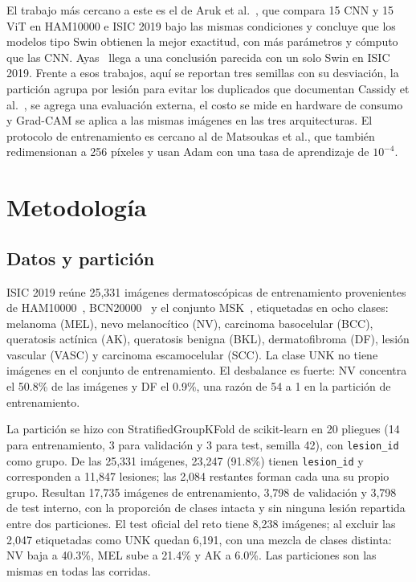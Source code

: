 \documentclass[conference]{IEEEtran}
\begin{document}
El trabajo más cercano a este es el de Aruk et al.~\cite{aruk2026comparison}, que compara 15 CNN y 15 ViT en HAM10000 e ISIC 2019 bajo las mismas condiciones y concluye que los modelos tipo Swin obtienen la mejor exactitud, con más parámetros y cómputo que las CNN. Ayas~\cite{ayas2023swin} llega a una conclusión parecida con un solo Swin en ISIC 2019. Frente a esos trabajos, aquí se reportan tres semillas con su desviación, la partición agrupa por lesión para evitar los duplicados que documentan Cassidy et al.~\cite{cassidy2022isic}, se agrega una evaluación externa, el costo se mide en hardware de consumo y Grad-CAM se aplica a las mismas imágenes en las tres arquitecturas. El protocolo de entrenamiento es cercano al de Matsoukas et al., que también redimensionan a 256 píxeles y usan Adam con una tasa de aprendizaje de $10^{-4}$.

\section{Metodología}

\subsection{Datos y partición}

ISIC 2019 reúne 25,331 imágenes dermatoscópicas de entrenamiento provenientes de HAM10000~\cite{tschandl2018ham10000}, BCN20000~\cite{hernandezperez2024bcn20000,combalia2019bcn20000} y el conjunto MSK~\cite{codella2017isic,codella2019isic2018}, etiquetadas en ocho clases: melanoma (MEL), nevo melanocítico (NV), carcinoma basocelular (BCC), queratosis actínica (AK), queratosis benigna (BKL), dermatofibroma (DF), lesión vascular (VASC) y carcinoma escamocelular (SCC). La clase UNK no tiene imágenes en el conjunto de entrenamiento. El desbalance es fuerte: NV concentra el 50.8\% de las imágenes y DF el 0.9\%, una razón de 54 a 1 en la partición de entrenamiento.

La partición se hizo con StratifiedGroupKFold de scikit-learn en 20 pliegues (14 para entrenamiento, 3 para validación y 3 para test, semilla 42), con \texttt{lesion\_id} como grupo. De las 25,331 imágenes, 23,247 (91.8\%) tienen \texttt{lesion\_id} y corresponden a 11,847 lesiones; las 2,084 restantes forman cada una su propio grupo. Resultan 17,735 imágenes de entrenamiento, 3,798 de validación y 3,798 de test interno, con la proporción de clases intacta y sin ninguna lesión repartida entre dos particiones. El test oficial del reto tiene 8,238 imágenes; al excluir las 2,047 etiquetadas como UNK quedan 6,191, con una mezcla de clases distinta: NV baja a 40.3\%, MEL sube a 21.4\% y AK a 6.0\%. Las particiones son las mismas en todas las corridas.
\end{document}
